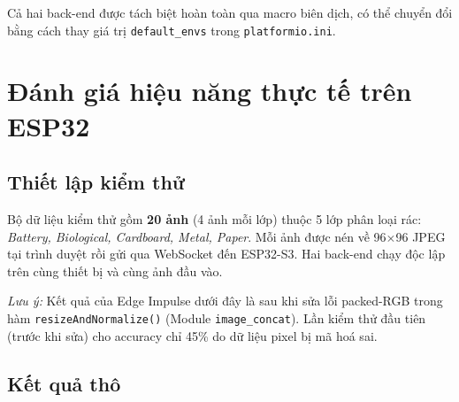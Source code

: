 \documentclass[12pt,a4paper]{article}
\begin{document}
Cả hai back-end được tách biệt hoàn toàn qua macro biên dịch, có thể chuyển đổi bằng cách thay giá trị \texttt{default\_envs} trong \texttt{platformio.ini}.

\section{Đánh giá hiệu năng thực tế trên ESP32}

\subsection{Thiết lập kiểm thử}

Bộ dữ liệu kiểm thử gồm \textbf{20 ảnh} (4 ảnh mỗi lớp) thuộc 5 lớp phân loại rác: \textit{Battery, Biological, Cardboard, Metal, Paper}. Mỗi ảnh được nén về 96$\times$96 JPEG tại trình duyệt rồi gửi qua WebSocket đến ESP32-S3. Hai back-end chạy độc lập trên cùng thiết bị và cùng ảnh đầu vào.

\textit{Lưu ý:} Kết quả của Edge Impulse dưới đây là sau khi sửa lỗi packed-RGB trong hàm \texttt{resizeAndNormalize()} (Module \texttt{image\_concat}). Lần kiểm thử đầu tiên (trước khi sửa) cho accuracy chỉ 45\% do dữ liệu pixel bị mã hoá sai.

\subsection{Kết quả thô}
\end{document}

